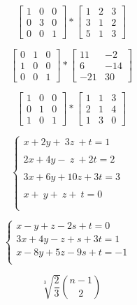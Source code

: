 \documentclass[10pt,a4paper]{article}
\begin{document}
$$
\left[ \begin{array}{ccc}
1 & 0 & 0 \\
0 & 3 & 0 \\
0 & 0 & 1
\end{array} \right]
*
\left[ \begin{array}{ccc}
1 & 2 & 3 \\
3 & 1 & 2 \\
5 & 1 & 3
\end{array} \right]
$$

$$
\left[ \begin{array}{ccc}
0 & 1 & 0 \\
1 & 0 & 0 \\
0 & 0 & 1
\end{array} \right]
*
\left[ \begin{array}{ccc}
11 & -2  \\
6 & -14 \\
-21 & 30
\end{array} \right]
$$

$$
\left[ \begin{array}{ccc}
1 & 0 & 0 \\
0 & 1 & 0 \\
1 & 0 & 1
\end{array} \right]
*
\left[ \begin{array}{ccc}
1 & 1 & 3 \\
2 & 1 & 4 \\
1 & 3 & 0
\end{array} \right]
$$

$$
\left\{ \begin{array}{ll}
x+2y+\ 3z\ +t = 1\\ & \\
2x+4y-\ z\ +2t = 2\\ & \\
3x+6y+10z+3t = 3\\ & \\
x+\ y+\ z+\ t = 0\\ & \\
\end{array} \right.
$$

$$
\left\{ \begin{array}{ll}
x-y+z-2s+t =0 & \\
3x+4y-z+s+3t = 1 & \\
x-8y+5z-9s+t = -1& \\
\end{array} \right.
$$

$$
\sqrt[3]{\frac{2}{3}}
{n-1 \choose 2} 
$$
\end{document}
